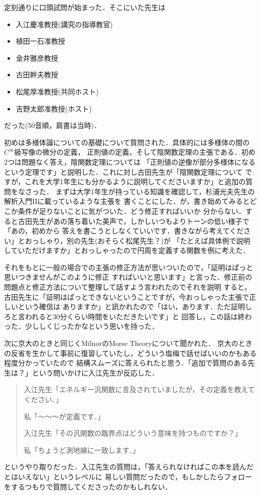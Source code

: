 \documentclass[dvipdfmx,uplatex]{jsarticle}
\begin{document}
定刻通りに口頭試問が始まった．そこにいた先生は
\begin{itemize}
  \item 入江慶准教授(講究の指導教官)
  \item 植田一石准教授
  \item 金井雅彦教授
  \item 古田幹夫教授
  \item 松尾厚准教授(共同ホスト)
  \item 吉野太郎准教授(ホスト)
\end{itemize}
だった(50音順，肩書は当時)．

初めは多様体論についての基礎について質問された．具体的には多様体の間の$C^\infty$級写像の微分の定義，
正則値の定義，そして陰関数定理の主張である．初め2つは問題なく答え，陰関数定理については
「正則値の逆像が部分多様体になるという定理です」と説明した．これに対し古田先生が「陰関数定理について
ですが，これを大学1年生にも分かるように説明してくださいますか」と追加の質問をなさった．
まずは大学1年生が持っている知識を確認して，杉浦光夫先生の解析入門IIに載っているような主張を
書くことにした．が，書き始めてみるとどこか条件が足りないことに気がついた．どう修正すればいいか
分からない．すると古田先生があの落ち着いた美声で，しかしいつもよりトーンの低い様子で「あの，初めから
答えを書こうとしなくていいです．書きながら考えてください」とおっしゃり，別の先生(おそらく松尾先生？)が
「たとえば具体例で説明していただけますか」とおっしゃったので円周を定義する関数を例に考えた．

それをもとに一般の場合での主張の修正方法が思いついたので，「証明はぱっと思いつきませんがこのように修正
すればいいと思います」と言った．修正前の問題点と修正方法について整理して話すよう言われたのでそれを説明
すると，古田先生に「証明はぱっとできないということですが，今おっしゃった主張で正しいという確信は
ありますか」と訊かれたので「はい，あります．ただ証明しろと言われると30分くらい時間をいただきたいです」と
回答し，この話は終わった．少ししくじったかなという思いを持った．

次に京大のときと同じくMilnorのMorse Theoryについて聞かれた．
京大のときの反省を生かして事前に復習していたし，どういう塩梅で話せばいいのかもある程度分かっていたので
結構スムーズに答えられたと思う．「追加で質問のある先生は？」という問いかけに入江先生が反応した．
\begin{quote}
  入江先生「エネルギー汎関数に言及されていましたが，その定義を教えてください．」

  私「～～～が定義です．」

  入江先生「その汎関数の臨界点はどういう意味を持つものですか？」

  私「ちょうど測地線に一致します．」
\end{quote}
というやり取りだった．入江先生の質問は，「答えられなければこの本を読んだとはいえない」というレベルに
易しい質問だったので，もしかしたらフォローをするつもりで質問してくださったのかもしれない．
\end{document}
